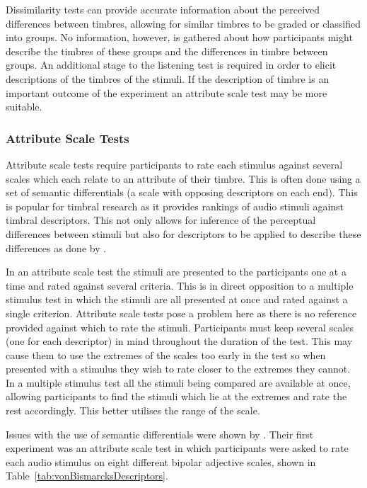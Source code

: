 			Dissimilarity tests can provide accurate information about the perceived differences between
			timbres, allowing for similar timbres to be graded or classified into groups. No information,
			however, is gathered about how participants might describe the timbres of these groups and the
			differences in timbre between groups. An additional stage to the listening test is required in
			order to elicit descriptions of the timbres of the stimuli. If the description of timbre is an
			important outcome of the experiment an attribute scale test may be more suitable.
			
		\subsubsection*{Attribute Scale Tests}
			Attribute scale tests require participants to rate each stimulus against several scales which each
			relate to an attribute of their timbre. This is often done using a set of semantic differentials (a
			scale with opposing descriptors on each end). This is popular for timbral research as it provides
			rankings of audio stimuli against timbral descriptors. This not only allows for inference of the
			perceptual differences between stimuli but also for descriptors to be applied to describe these
			differences as done by \citet{zacharakis2014an}. 			
			
			In an attribute scale test the stimuli are presented to the participants one at a time and rated
			against several criteria. This is in direct opposition to a multiple stimulus test in which the
			stimuli are all presented at once and rated against a single criterion. Attribute scale tests pose
			a problem here as there is no reference provided against which to rate the stimuli. Participants
			must keep several scales (one for each descriptor) in mind throughout the duration of the test.
			This may cause them to use the extremes of the scales too early in the test so when presented with
			a stimulus they wish to rate closer to the extremes they cannot. In a multiple stimulus test all
			the stimuli being compared are available at once, allowing participants to find the stimuli which
			lie at the extremes and rate the rest accordingly. This better utilises the range of the scale. 
			
			Issues with the use of semantic differentials were shown by \citet{kendall1993verbal1}. Their first
			experiment was an attribute scale test in which participants were asked to rate each audio stimulus
			on eight different bipolar adjective scales, shown in Table~\ref{tab:vonBismarcksDescriptors}.

